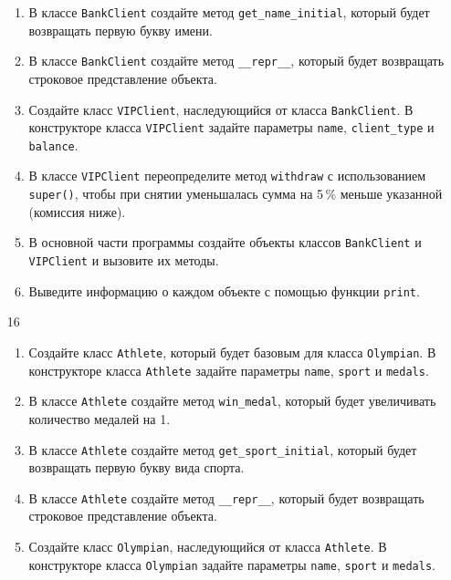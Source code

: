 \begin{enumerate}
\begin{enumerate}[leftmargin=*]
    \item В классе \texttt{BankClient} создайте метод \texttt{get\_name\_initial}, который будет возвращать первую букву имени.
    
    \item В классе \texttt{BankClient} создайте метод \texttt{\_\_repr\_\_}, который будет возвращать строковое представление объекта.
    
    \item Создайте класс \texttt{VIPClient}, наследующийся от класса \texttt{BankClient}. В конструкторе класса \texttt{VIPClient} задайте параметры \texttt{name}, \texttt{client\_type} и \texttt{balance}.
    
    \item В классе \texttt{VIPClient} переопределите метод \texttt{withdraw} с использованием \texttt{super()}, чтобы при снятии уменьшалась сумма на 5\,\% меньше указанной (комиссия ниже).
    
    \item В основной части программы создайте объекты классов \texttt{BankClient} и \texttt{VIPClient} и вызовите их методы.
    
    \item Выведите информацию о каждом объекте с помощью функции \texttt{print}.
\end{enumerate}

\item[16] 
\begin{enumerate}[leftmargin=*]
    \item Создайте класс \texttt{Athlete}, который будет базовым для класса \texttt{Olympian}. В конструкторе класса \texttt{Athlete} задайте параметры \texttt{name}, \texttt{sport} и \texttt{medals}.
    
    \item В классе \texttt{Athlete} создайте метод \texttt{win\_medal}, который будет увеличивать количество медалей на 1.
    
    \item В классе \texttt{Athlete} создайте метод \texttt{get\_sport\_initial}, который будет возвращать первую букву вида спорта.
    
    \item В классе \texttt{Athlete} создайте метод \texttt{\_\_repr\_\_}, который будет возвращать строковое представление объекта.
    
    \item Создайте класс \texttt{Olympian}, наследующийся от класса \texttt{Athlete}. В конструкторе класса \texttt{Olympian} задайте параметры \texttt{name}, \texttt{sport} и \texttt{medals}.
    

\end{enumerate}
\end{enumerate}

